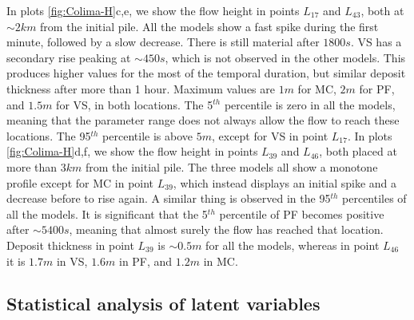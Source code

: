 \documentclass{article}
\begin{document}
In plots \ref{fig:Colima-H}c,e, we show the flow height in points $L_{17}$ and $L_{43}$, both at $\sim 2 km$ from the initial pile. All the models show a fast spike during the first minute, followed by a slow decrease. There is still material after $1800 s$. VS has a secondary rise peaking at $\sim 450 s$, which is not observed in the other models. This produces higher values for the most of the temporal duration, but similar deposit thickness after more than 1 hour. Maximum values are $1 m$ for MC, $2 m$ for PF, and $1.5 m$ for VS, in both locations. The 5$^{th}$ percentile is zero in all the models, meaning that the parameter range does not always allow the flow to reach these locations. The 95$^{th}$ percentile is above $5 m$, except for VS in point $L_{17}$. In plots \ref{fig:Colima-H}d,f, we show the flow height in points $L_{39}$ and $L_{46}$, both placed at more than $3 km$ from the initial pile. The three models all show a monotone profile except for  MC in point $L_{39}$, which instead displays an initial spike and a decrease before to rise again. A similar thing is observed in the 95$^{th}$ percentiles of all the models. It is significant that the 5$^{th}$ percentile of PF becomes positive after $\sim 5400 s$, meaning that almost surely the flow has reached that location. Deposit thickness in point $L_{39}$ is $\sim 0.5 m$ for all the models, whereas in point $L_{46}$ it is $1.7 m$ in VS, $1.6 m$ in PF, and $1.2 m$ in MC.
\newpage
\subsection{Statistical analysis of latent variables}\label{Hq2}
\end{document}

